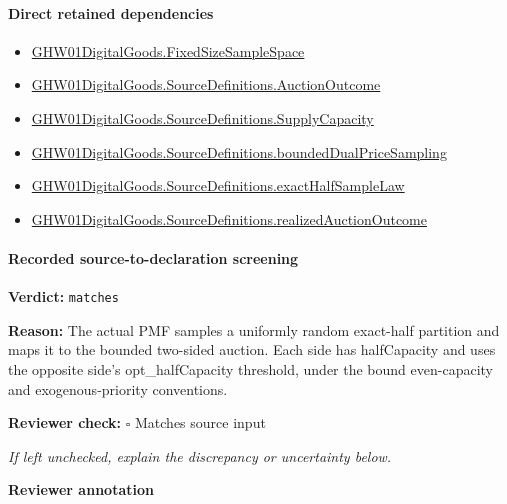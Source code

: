 \documentclass[10pt]{article}
\newcommand{\reviewerbox}{%
  \par\noindent\fbox{\parbox{0.96\linewidth}{\rule{0pt}{0.38in}}}\par
}
\newcommand{\reviewmatch}[1]{%
  \par\noindent\textbf{Reviewer check:} $\square$\; #1\par
  \noindent\emph{If left unchecked, explain the discrepancy or uncertainty below.}\par
}
\begin{document}
\paragraph{Direct retained dependencies}
\begin{itemize}\raggedright
\item \hyperlink{governing-declaration-54cc4fd1a8d109e5}{GHW01\allowbreak{}Digital\allowbreak{}Goods.\allowbreak{}Fixed\allowbreak{}Size\allowbreak{}Sample\allowbreak{}Space}
\item \hyperlink{paper-prerequisite-fc173e8d557afd08}{GHW01\allowbreak{}Digital\allowbreak{}Goods.\allowbreak{}Source\allowbreak{}Definitions.\allowbreak{}Auction\allowbreak{}Outcome}
\item \hyperlink{governing-declaration-b45673e2f2fa9536}{GHW01\allowbreak{}Digital\allowbreak{}Goods.\allowbreak{}Source\allowbreak{}Definitions.\allowbreak{}Supply\allowbreak{}Capacity}
\item \hyperlink{paper-prerequisite-75e5f2af0e2f1694}{GHW01\allowbreak{}Digital\allowbreak{}Goods.\allowbreak{}Source\allowbreak{}Definitions.\allowbreak{}bounded\allowbreak{}Dual\allowbreak{}Price\allowbreak{}Sampling}
\item \hyperlink{governing-declaration-b9c23d6d120bb104}{GHW01\allowbreak{}Digital\allowbreak{}Goods.\allowbreak{}Source\allowbreak{}Definitions.\allowbreak{}exact\allowbreak{}Half\allowbreak{}Sample\allowbreak{}Law}
\item \hyperlink{governing-declaration-1f8637b360987e0b}{GHW01\allowbreak{}Digital\allowbreak{}Goods.\allowbreak{}Source\allowbreak{}Definitions.\allowbreak{}realized\allowbreak{}Auction\allowbreak{}Outcome}
\end{itemize}
\paragraph{Recorded source-to-declaration screening}
\textbf{Verdict:} \texttt{matches}
\\
{\raggedright
\textbf{Reason:} The actual PMF samples a uniformly random exact-\allowbreak{}half partition and maps it to the bounded two-\allowbreak{}sided auction.\allowbreak{} Each side has halfCapacity and uses the opposite side's opt\_\allowbreak{}halfCapacity threshold, under the bound even-\allowbreak{}capacity and exogenous-\allowbreak{}priority conventions.\allowbreak{}
\par}
\reviewmatch{Matches source input}
\noindent\textbf{Reviewer annotation}\par
\reviewerbox
\clearpage
\hypertarget{paper-prerequisite-6e59fa6a7ec053ac}{}
\end{document}
